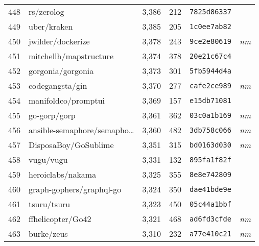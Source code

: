 {\begin{supertabular}{llrrll}
        448 &                         rs/zerolog &  3,386 &    212 &  \texttt{7825d86337} &              \\
        449 &                        uber/kraken &  3,385 &    205 &  \texttt{1c0ee7ab82} &              \\
        450 &                  jwilder/dockerize &  3,378 &    243 &  \texttt{9ce2e80619} &  \textit{nm} \\
        451 &             mitchellh/mapstructure &  3,374 &    378 &  \texttt{20e21c67c4} &              \\
        452 &                  gorgonia/gorgonia &  3,373 &    301 &  \texttt{5fb5944d4a} &              \\
        453 &                    codegangsta/gin &  3,370 &    277 &  \texttt{cafe2ce989} &  \textit{nm} \\
        454 &                manifoldco/promptui &  3,369 &    157 &  \texttt{e15db71081} &              \\
        455 &                       go-gorp/gorp &  3,361 &    362 &  \texttt{03c0a1b169} &  \textit{nm} \\
        456 &    ansible-semaphore/semapho\ldots &  3,360 &    482 &  \texttt{3db758c066} &  \textit{nm} \\
        457 &               DisposaBoy/GoSublime &  3,351 &    315 &  \texttt{bd0163d030} &  \textit{nm} \\
        458 &                          vugu/vugu &  3,331 &    132 &  \texttt{895fa1f82f} &              \\
        459 &                  heroiclabs/nakama &  3,325 &    355 &  \texttt{8e8e742809} &              \\
        460 &           graph-gophers/graphql-go &  3,324 &    350 &  \texttt{dae41bde9e} &              \\
        461 &                        tsuru/tsuru &  3,323 &    450 &  \texttt{05c44a1bbf} &              \\
        462 &                  ffhelicopter/Go42 &  3,321 &    468 &  \texttt{ad6fd3cfde} &  \textit{nm} \\
        463 &                         burke/zeus &  3,310 &    232 &  \texttt{a77e410c21} &  \textit{nm} \\

\end{supertabular}}
